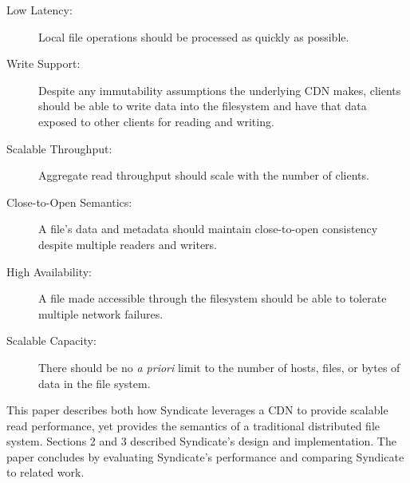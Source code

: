 \begin{description}
 
\item[Low Latency:] Local file operations should be processed as quickly as possible.
\item[Write Support:] Despite any immutability assumptions the underlying CDN makes, clients
should be able to write data into the filesystem and have that data exposed to other clients
for reading and writing.
\item[Scalable Throughput:] Aggregate read throughput should scale
with the number of clients.
\item[Close-to-Open Semantics:] A file's data and metadata should maintain
close-to-open consistency despite multiple readers and writers.
\item[High Availability:] A file made accessible through the
filesystem should be able to tolerate multiple network failures.
\item[Scalable Capacity:] There should be no \textit{a priori} limit to the number
of hosts, files, or bytes of data in the file system.
 
\end{description}
  
This paper describes both how Syndicate leverages a CDN to provide
scalable read performance, yet provides the semantics of a traditional
distributed file system. Sections 2 and 3 described Syndicate's design
and implementation. The paper concludes by evaluating Syndicate's
performance and comparing Syndicate to related work.

